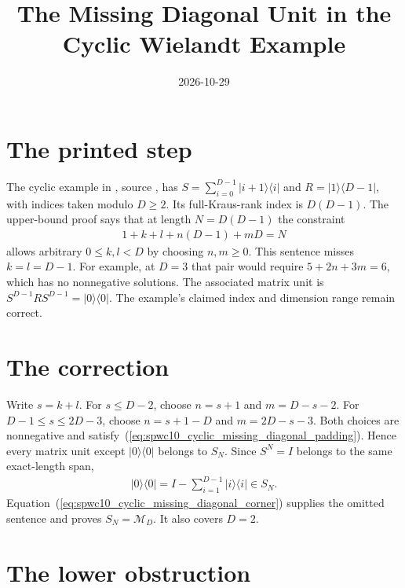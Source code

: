 \documentclass{article}
\title{The Missing Diagonal Unit in the Cyclic Wielandt Example}
\author{}
\date{2026-10-29}
\begin{document}
\maketitle
{}

\section{The printed step}

The cyclic example in \cite{Sanz2010Quantum}, source
, has
$S=\sum_{i=0}^{D-1}|i+1\rangle\langle i|$ and
$R=|1\rangle\langle D-1|$, with indices taken modulo $D\ge2$.
Its full-Kraus-rank index is $D(D-1)$.
The upper-bound proof says that at length $N=D(D-1)$ the constraint
\begin{align}
    1+k+l+n(D-1)+mD=N
    \label{eq:spwc10_cyclic_missing_diagonal_padding}
\end{align}
allows arbitrary $0\le k,l<D$ by choosing $n,m\ge0$.
This sentence misses $k=l=D-1$. For example, at $D=3$ that pair
would require $5+2n+3m=6$, which has no nonnegative solutions.
The associated matrix unit is $S^{D-1}RS^{D-1}=|0\rangle\langle0|$.
The example's claimed index and dimension range remain correct.

\section{The correction}

Write $s=k+l$. For $s\le D-2$, choose $n=s+1$ and $m=D-s-2$.
For $D-1\le s\le2D-3$, choose $n=s+1-D$ and $m=2D-s-3$.
Both choices are nonnegative and satisfy~(\ref{eq:spwc10_cyclic_missing_diagonal_padding}).
Hence every matrix unit except $|0\rangle\langle0|$ belongs to $S_N$.
Since $S^N=I$ belongs to the same exact-length span,
\begin{align}
    |0\rangle\langle0|
    =I-\sum_{i=1}^{D-1}|i\rangle\langle i|\in S_N.
    \label{eq:spwc10_cyclic_missing_diagonal_corner}
\end{align}
Equation~(\ref{eq:spwc10_cyclic_missing_diagonal_corner}) supplies the
omitted sentence and proves $S_N=\mathcal M_D$.
It also covers $D=2$.

\section{The lower obstruction}
\end{document}
